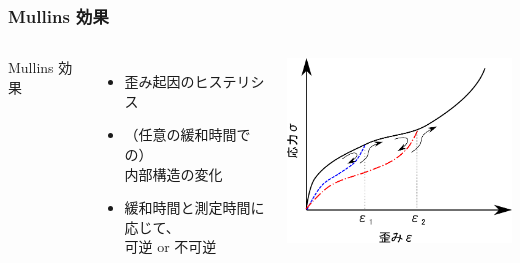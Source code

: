 \documentclass[unicode,11pt]{beamer}%
\begin{document}
\begin{frame}
\frametitle{Mullins 効果}
\transboxin
\begin{columns}[totalwidth=1\textwidth]
Mullins 効果
	\begin{itemize}
		\item 歪み起因のヒステリシス
		\item （任意の緩和時間での）\\ \alert{内部構造の変化}
		\item 緩和時間と測定時間に\\応じて、\\{\color{red} 可逆} or 不可逆
	\end{itemize}
 \centering
	\includegraphics[width=65mm]{./fig/Mullins_Efct.pdf}
\end{columns}

\end{frame}
\end{document}
